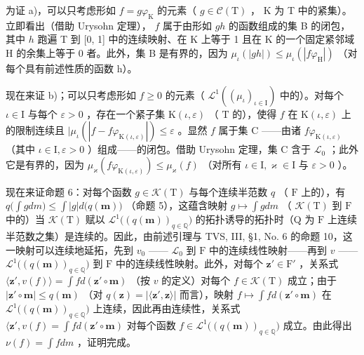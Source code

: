 为证 a)，可以只考虑形如 \(f = g\varphi_{\mathrm{K}}\) 的元素（ \(g \in \mathcal{C}(\mathrm{T})\) ， K 为 T 中的紧集）。立即看出（借助 Urysohn 定理）， \(f\) 属于由形如 \(gh\) 的函数组成的集 B 的闭包，其中 \(h\) 跑遍 T 到 {[}0, 1{]} 中的连续映射、在 K 上等于 1 且在 K 的一个固定紧邻域 H 的余集上等于 0 者。此外，集 B 是有界的，因为 \(\mu_{\iota}(|gh|) \leqslant \mu_{\iota}(|f\varphi_{\mathrm{H}}|)\) （对每个具有前述性质的函数 h）。

现在来证 b)；可以只考虑形如 \(f \geqslant 0\) 的元素（ \(\mathcal{L}^1((\mu_\iota)_{\iota \in \mathrm{I}})\) 中的）。对每个 \(\iota \in \mathrm{I}\) 与每个 \(\varepsilon > 0\) ，存在一个紧子集 \(\mathrm{K}(\iota, \varepsilon)\) （ \(\mathrm{T}\) 的），使得 \(f\) 在 \(\mathrm{K}(\iota, \varepsilon)\) 上的限制连续且 \(|\mu_\iota(|f - f\varphi_{\mathrm{K}(\iota, \varepsilon)}|) \leqslant \varepsilon\) 。显然 \(f\) 属于集 \(\mathrm{C}\) ——由诸 \(f\varphi_{\mathrm{K}(\iota, \varepsilon)}\) （其中 \(\iota \in \mathrm{I}, \varepsilon > 0\) ）组成——的闭包。借助 Urysohn 定理，集 \(\mathrm{C}\) 含于 \(\mathcal{L}_0\) ；此外它是有界的，因为 \(\mu_\varkappa(f\varphi_{\mathrm{K}(\iota, \varepsilon)}) \leqslant \mu_\varkappa(f)\) （对所有 \(\iota \in \mathrm{I}, \varkappa \in \mathrm{I}\) 与 \(\varepsilon > 0\) ）。

现在来证命题 6：对每个函数 \(g \in \mathcal{K}(\mathrm{T})\) 与每个连续半范数 \(q\) （ \(\mathrm{F}\) 上的），有 \(q\big(\int g dm\big) \leqslant \int |g| d\big(q(\mathbf{m})\big)\) （命题 5），这蕴含映射 \(g \mapsto \int g dm\) （ \(\mathcal{K}(\mathrm{T})\) 到 \(\mathrm{F}\) 中的）当 \(\mathcal{K}(\mathrm{T})\) 赋以 \(\mathcal{L}^1\big((q(\mathbf{m}))_{q \in \mathbb{Q}}\big)\) 的拓扑诱导的拓扑时（Q 为 \(\mathrm{F}\) 上连续半范数之集）是连续的。因此，由前述引理与 TVS, III, §1, No. 6 的命题 10，这一映射可以连续地延拓，先到 \(v_0\) —— \(\mathcal{L}_0\) 到 \(\mathrm{F}\) 中的连续线性映射——再到 \(v\) —— \(\mathcal{L}^1\big((q(\mathbf{m}))_{q \in \mathbb{Q}}\big)\) 到 \(\mathrm{F}\) 中的连续线性映射。此外，对每个 \(\mathbf{z}' \in \mathrm{F}'\) ，关系式 \(\langle \mathbf{z}', v(f) \rangle = \int f d(\mathbf{z}' \circ \mathbf{m})\) （按 \(v\) 的定义）对每个 \(f \in \mathcal{K}(\mathrm{T})\) 成立；由于 \(|\mathbf{z}' \circ \mathbf{m}| \leqslant q(\mathbf{m})\) （对 \(q(\mathbf{z}) = |\langle \mathbf{z}', \mathbf{z} \rangle|\) 而言），映射 \(f \mapsto \int f d(\mathbf{z}' \circ \mathbf{m})\) 在 \(\mathcal{L}^1\big((q(\mathbf{m}))_{q \in \mathbb{Q}}\big)\) 上连续，因此再由连续性，关系式 \(\langle \mathbf{z}', v(f) = \int f d(\mathbf{z}' \circ \mathbf{m})\) 对每个函数 \(f \in \mathcal{L}^1\big((q(\mathbf{m}))_{q \in \mathbb{Q}}\big)\) 成立。由此得出 \(\nu(f) = \int f dm\) ，证明完成。

